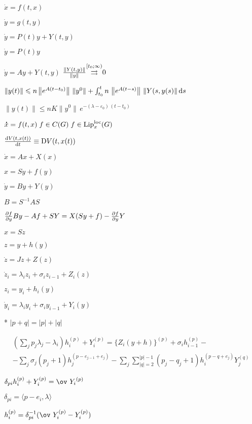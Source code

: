\documentclass[timbord]{longnotes}
\DeclareMathOperator\Lip{Lip}
\def\Liploc{\Lip^{\rm loc}}
\begin{document}
\begin{list}
    \nch
  \item $\dot x = f(t,x)$
  \item $\dot y = g(t,y)$
  \item $\dot y = P(t) y + Y(t,y)$
  \item $\dot y = P(t)y$
  \item $\dot y = Ay + Y(t,y)$ \hfill $\frac{\|Y(t,y)\|}{\|y\|} \overset{[t_0;\infty)}{\mathop{\rightrightarrows}\limits} 0 $
  \item $\|y(t)\| \leqslant n \left\|e^{A(t-t_0)}\right\|\, \|y^0\| + 
    \int_{t_0}^t n \, \left\|e^{A(t-s)}\right\| \, \|Y(s,y(s)\|\, \mathrm{d} s$
  \item $\|y(t)\| \leqslant n K \|y^0\|\, e^{-(\lambda- \varepsilon_0) \, (t-t_0)}$
    \skeq[3]
  \item $\dot x =f(t,x) \; f \in C(G) \; f \in \Liploc_x(G)$
  \item $\fder{V(t,x(t))}{t} \equiv \mathrm D V(t,x(t))$ 
    \nch
  \item $\dot x = Ax + X(x)$
  \item $x= Sy+f(y)$
  \item $\dot y = By + Y(y)$
  \item $B =  S^{-1} A S$
  \item $\pder fy B y - Af + SY = X(Sy + f) - \pder{f}{y} Y$
  \item $x = Sz$
  \item $z = y + h(y)$
  \item $\dot z= Jz+Z(z)$
  \item $\dot z_i = \lambda_i z_i + \sigma_i z_{i-1} + Z_i(z)$
  \item $z_i = y_i + h_i(y)$
  \item $\dot y_i = \lambda_i y_i + \sigma_i y_{i-1} + Y_i(y)$
  \item [*] $|p +q| = |p| + |q|$ \hfill{\flame}
  \item $\begin{aligned}
      &\left(\sum_j p_j \lambda_j - \lambda_i\right) h_i^{(p)} + Y_i^{(p)} 
      =  \bigl\{Z_i(y + h) \bigr\}^{(p)} + \sigma_i h_{i-1}^{(p)} - \\ 
      &- \sum_j \sigma_j (p_j + 1) h_j ^{(p-e_{j-1}+e_j)} 
      - \sum_j \sum\limits_{|q|=2}^{|p|-1}(p_j - q_j +1) h_i^{(p-q+e_j)} Y_j^{(q)} 
    \end{aligned}$
  \item $\delta_{pi}h_i ^{(p)} + Y_i^{(p)} = \ov~{Y_i}^{(p)}$
  \item $\delta_{pi} = \langle p-e_i, \lambda \rangle$
  \item $h_i^{(p)} = \delta_{pi}^{-1} (\ov~{Y}_i^{(p)} - Y_i ^{(p)})$

\end{list}
\end{document}
